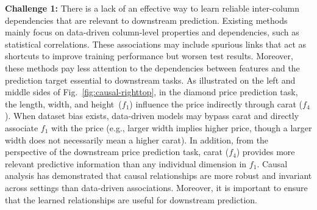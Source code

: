 \documentclass[conference]{IEEEtran}
\newcommand{\rem}[1]{{\color{black}#1}}
\newcommand{\vldb}[1]{{\color{black}#1}}
\newcommand{\zjic}[1]{{\color{black}#1}}
\newcommand{\syic}[1]{{\color{black}#1}}
\newcommand{\syone}[1]{{\color{black}#1}}
\begin{document}
\textbf{Challenge 1:}
\syic{
There is a lack of an effective way to learn reliable inter-column dependencies that are relevant to downstream prediction.
}
\zjic{
Existing methods mainly focus on data-driven column-level properties and dependencies, such as statistical correlations. 
These associations may include spurious links that act as shortcuts to improve training performance but worsen test results. \syone{Moreover, these methods} pay less attention to the dependencies between features and the prediction target essential to downstream tasks.
}
As illustrated on the left \vldb{and middle sides} of Fig.~\ref{fig:causal-righttop}, 
in the diamond price prediction task, \rem{the length, width, and height~\syone{($f_1$)}} influence the price indirectly through carat ($f_4$). 
When dataset bias exists, \syone{data-driven} models may bypass carat and directly associate $f_1$ with the price (e.g., \rem{larger width implies higher price, though a larger width does not necessarily mean a higher carat).}
\syic{In addition, from the perspective of the downstream price prediction task, carat ($f_4$) provides more relevant predictive information than any individual dimension in $f_1$.}
Causal analysis has demonstrated that causal relationships are more robust and invariant across settings\cite{r:causalgood} than data-driven associations.
\syic{Moreover, it is important to ensure that the learned relationships are useful for downstream prediction.}
\end{document}
